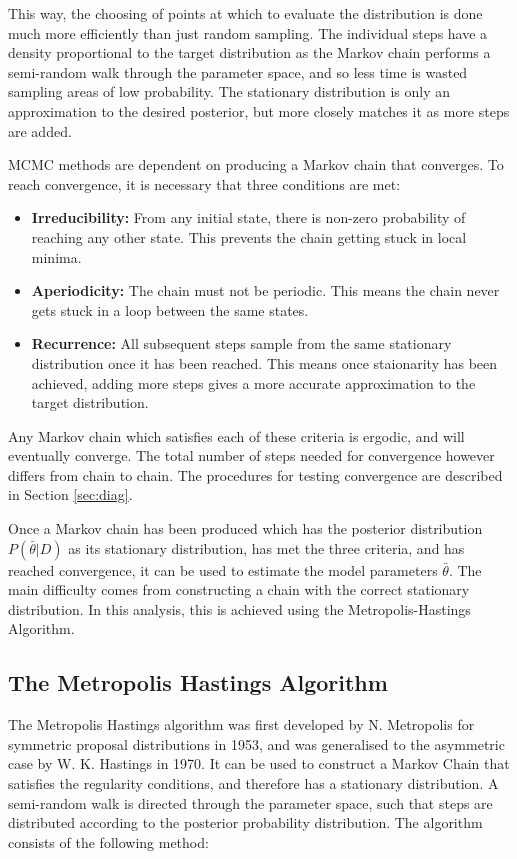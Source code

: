 This way, the choosing of points at which to evaluate the distribution is done much more efficiently than just random sampling. The individual steps have a density proportional to the target distribution as the Markov chain performs a semi-random walk through the parameter space, and so less time is wasted sampling areas of low probability.  The stationary distribution is only an approximation to the desired posterior, but more closely matches it as more steps are added. 

MCMC methods are dependent on producing a Markov chain that converges. To reach convergence, it is necessary that three conditions are met:

\begin{itemize}
   \item \textbf{Irreducibility:} From any initial state, there is non-zero probability of reaching any other state. This prevents the chain getting stuck in local minima.
   \item \textbf{Aperiodicity:} The chain must not be periodic. This means the chain never gets stuck in a loop between the same states.
   \item \textbf{Recurrence:} All subsequent steps sample from the same stationary distribution once it has been reached. This means once staionarity has been achieved, adding more steps gives a more accurate approximation to the target distribution.
\end{itemize}

Any Markov chain which satisfies each of these criteria is ergodic, and will eventually converge. The total number of steps needed for convergence however differs from chain to chain. The procedures for testing convergence are described in Section \ref{sec:diag}. 

Once a Markov chain has been produced which has the posterior distribution $P(\bar{\theta}|D)$ as its stationary distribution, has met the three criteria, and has reached convergence, it can be used to estimate the model parameters $\bar{\theta}$. The main difficulty comes from constructing a chain with the correct stationary distribution. In this analysis, this is achieved using the Metropolis-Hastings Algorithm.

\subsection{The Metropolis Hastings Algorithm}\label{sec:methast}

The Metropolis Hastings algorithm was first developed by N. Metropolis for symmetric proposal distributions in 1953\cite{met}, and was generalised to the asymmetric case by  W. K. Hastings in 1970\cite{methast}. It can be used to construct a Markov Chain that satisfies the regularity conditions, and therefore has a stationary distribution. A semi-random walk is directed through the parameter space, such that steps are distributed according to the posterior probability distribution. The algorithm consists of the following method:

